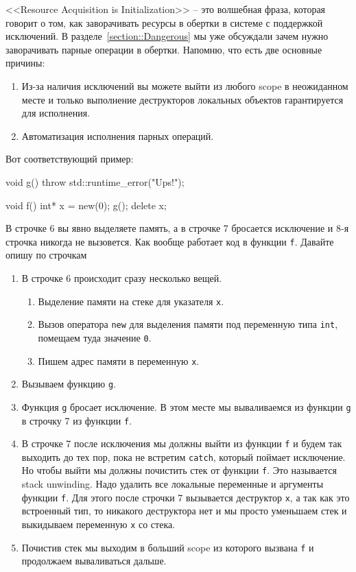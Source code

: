 <<Resource Acquisition is Initialization>> -- это волшебная фраза, которая говорит о том, как заворачивать ресурсы в обертки в системе с поддержкой исключений.
В разделе~\ref{section::Dangerous} мы уже обсуждали зачем нужно заворачивать парные операции в обертки.
Напомню, что есть две основные причины:
\begin{enumerate}
\item Из-за наличия исключений вы можете выйти из любого scope в неожиданном месте и только выполнение деструкторов локальных объектов гарантируется для исполнения.

\item Автоматизация исполнения парных операций.
\end{enumerate}
Вот соответствующий пример:
\begin{cppcode}
void g() {
  throw std::runtime_error("Ups!");
}

void f() {
  int* x = new(0);
  g();
  delete x;
}
\end{cppcode}
В строчке 6 вы явно выделяете память, а в строчке 7 бросается исключение и 8-я строчка никогда не вызовется.
Как вообще работает код в функции \verb"f".
Давайте опишу по строчкам
\begin{enumerate}
\item В строчке 6 происходит сразу несколько вещей.

\begin{enumerate}
\item Выделение памяти на стеке для указателя \verb"x".

\item Вызов оператора \verb"new" для выделения памяти под переменную типа \verb"int", помещаем туда значение \verb"0".

\item Пишем адрес памяти в переменную \verb"x".
\end{enumerate}

\item Вызываем функцию \verb"g".

\item Функция \verb"g" бросает исключение.
В этом месте мы вываливаемся из функции \verb"g" в строчку 7 из функции \verb"f".

\item В строчке 7 после исключения мы должны выйти из функции \verb"f" и будем так выходить до тех пор, пока не встретим \verb"catch", который поймает исключение.
Но чтобы выйти мы должны почистить стек от функции \verb"f".
Это называется stack unwinding.
Надо удалить все локальные переменные и аргументы функции \verb"f".
Для этого после строчки 7 вызывается деструктор \verb"x", а так как это встроенный тип, то никакого деструктора нет и мы просто уменьшаем стек и выкидываем переменную \verb"x" со стека.

\item Почистив стек мы выходим в больший scope из которого вызвана \verb"f" и продолжаем вываливаться дальше.
\end{enumerate}
